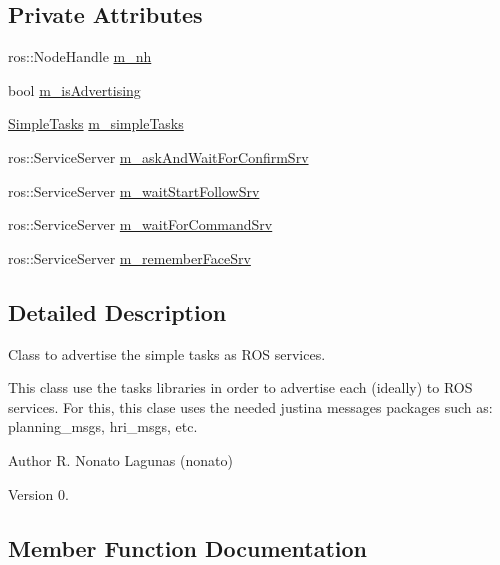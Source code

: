 \subsection*{Private Attributes}
\begin{DoxyCompactItemize}
\item 
ros\+::\+Node\+Handle \hyperlink{class_task_advertiser_ac2b3e206897a243a661863c27fcf7e96}{m\+\_\+nh}
\item 
bool \hyperlink{class_task_advertiser_a399c52352a5d0663074e03ad6ecae4c3}{m\+\_\+is\+Advertising}
\item 
\hyperlink{class_simple_tasks}{Simple\+Tasks} \hyperlink{class_task_advertiser_acb092dd73221cb9c470e322e87530933}{m\+\_\+simple\+Tasks}
\item 
ros\+::\+Service\+Server \hyperlink{class_task_advertiser_a0e0bb754c07d002d62fdd0572dc85775}{m\+\_\+ask\+And\+Wait\+For\+Confirm\+Srv}
\item 
ros\+::\+Service\+Server \hyperlink{class_task_advertiser_a4d28e93a047d967b4a632a61ba94f314}{m\+\_\+wait\+Start\+Follow\+Srv}
\item 
ros\+::\+Service\+Server \hyperlink{class_task_advertiser_a57822e31555f279e363c19555ff01683}{m\+\_\+wait\+For\+Command\+Srv}
\item 
ros\+::\+Service\+Server \hyperlink{class_task_advertiser_af4a9ec62d358dd0bfadc7f14ea56976c}{m\+\_\+remember\+Face\+Srv}
\end{DoxyCompactItemize}


\subsection{Detailed Description}
Class to advertise the simple tasks as R\+OS services. 

This class use the tasks libraries in order to advertise each (ideally) to R\+OS services. For this, this clase uses the needed justina messages packages such as\+: planning\+\_\+msgs, hri\+\_\+msgs, etc.

\begin{DoxyAuthor}{Author}
R. Nonato Lagunas (nonato) 
\end{DoxyAuthor}
\begin{DoxyVersion}{Version}
0. 
\end{DoxyVersion}


\subsection{Member Function Documentation}
